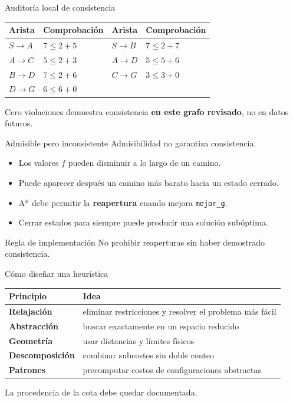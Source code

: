 \documentclass[aspectratio=169,11pt]{beamer}
\newcommand{\concepto}[1]{\textcolor{UAPTeal}{\textbf{#1}}}
\begin{document}
\begin{frame}{Auditoría local de consistencia}
  \small
  \begin{tabularx}{\textwidth}{>{\bfseries}p{}p{}>{\bfseries}p{}X}
    \toprule
    Arista & Comprobación & Arista & Comprobación \\\midrule
    $S\rightarrow A$ & $7\leq2+5$ & $S\rightarrow B$ & $7\leq2+7$ \\
    $A\rightarrow C$ & $5\leq2+3$ & $A\rightarrow D$ & $5\leq5+6$ \\
    $B\rightarrow D$ & $7\leq2+6$ & $C\rightarrow G$ & $3\leq3+0$ \\
    $D\rightarrow G$ & $6\leq6+0$ & & \\
    \bottomrule
  \end{tabularx}
  \vfill
  Cero violaciones demuestra consistencia \concepto{en este grafo revisado}, no en datos futuros.
\end{frame}

\begin{frame}{Admisible pero inconsistente}
  Admisibilidad no garantiza consistencia.
  \begin{itemize}
    \item Los valores $f$ pueden disminuir a lo largo de un camino.
    \item Puede aparecer después un camino más barato hacia un estado cerrado.
    \item A* debe permitir la \concepto{reapertura} cuando mejora \texttt{mejor\_g}.
    \item Cerrar estados para siempre puede producir una solución subóptima.
  \end{itemize}
  \begin{alertblock}{Regla de implementación}
    No prohibir reaperturas sin haber demostrado consistencia.
  \end{alertblock}
\end{frame}

\begin{frame}{Cómo diseñar una heurística}
  \scriptsize
  \begin{tabularx}{\textwidth}{>{\bfseries}p{}X}
    \toprule
    Principio & Idea \\\midrule
    Relajación & eliminar restricciones y resolver el problema más fácil \\
    Abstracción & buscar exactamente en un espacio reducido \\
    Geometría & usar distancias y límites físicos \\
    Descomposición & combinar subcostos sin doble conteo \\
    Patrones & precomputar costos de configuraciones abstractas \\
    \bottomrule
  \end{tabularx}
  \vfill
  \alert{La procedencia de la cota debe quedar documentada.}
\end{frame}
\end{document}
